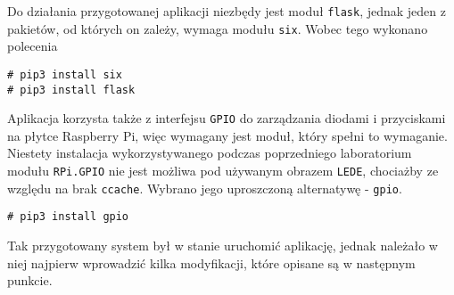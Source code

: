 \documentclass[10pt,a4paper]{article}
\begin{document}
Do działania przygotowanej aplikacji niezbędy jest moduł \texttt{flask}, jednak jeden z pakietów, od których on zależy, wymaga modułu \texttt{six}. Wobec tego wykonano polecenia
\begin{lstlisting}[style=bash, commentstyle=\color{black}]
# pip3 install six
# pip3 install flask
\end{lstlisting}
Aplikacja korzysta także z interfejsu \texttt{GPIO} do zarządzania diodami i przyciskami na płytce Raspberry Pi, więc wymagany jest moduł, który spełni to wymaganie. Niestety instalacja wykorzystywanego podczas poprzedniego laboratorium modułu \texttt{RPi.GPIO} nie jest możliwa pod używanym obrazem \texttt{LEDE}, chociażby ze względu na brak \texttt{ccache}. Wybrano jego uproszczoną alternatywę - \texttt{gpio}.
\begin{lstlisting}[style=bash, commentstyle=\color{black}]
# pip3 install gpio
\end{lstlisting}
Tak przygotowany system był w stanie uruchomić aplikację, jednak należało w niej najpierw wprowadzić kilka modyfikacji, które opisane są w następnym punkcie.
\end{document}
